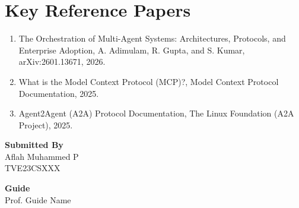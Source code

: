 \documentclass[12pt]{article}
\newcommand{\studentname}{Aflah Muhammed P}
\newcommand{\rollno}{TVE23CSXXX}
\newcommand{\guidename}{Prof. Guide Name}
\begin{document}
\section*{Key Reference Papers}
\begin{enumerate}
  \item The Orchestration of Multi-Agent Systems: Architectures, Protocols, and Enterprise Adoption, A. Adimulam, R. Gupta, and S. Kumar, arXiv:2601.13671, 2026.
  \item What is the Model Context Protocol (MCP)?, Model Context Protocol Documentation, 2025.
  \item Agent2Agent (A2A) Protocol Documentation, The Linux Foundation (A2A Project), 2025.
\end{enumerate}
\vspace{1.5em}

\noindent\textbf{Submitted By}\\
\studentname\\
\rollno

\vspace{1em}
\noindent\textbf{Guide}\\
\guidename
\end{document}
